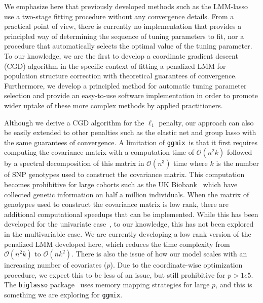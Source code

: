 \documentclass[12pt,letter]{article}\usepackage[]{graphicx}\usepackage[]{color}
\newcommand{\ggmix}{\texttt{ggmix}}
\begin{document}

We emphasize here that previously developed methods such as the LMM-lasso~\citep{rakitsch2013lasso} use a two-stage fitting procedure without any convergence details.
From a practical point of view, there is currently no implementation that provides a principled way of determining the sequence of tuning parameters to fit, nor a procedure that automatically selects the optimal value of the tuning parameter.
To our knowledge, we are the first to develop a coordinate gradient descent (CGD) algorithm in the specific context of fitting a penalized LMM for population structure correction with theoretical guarantees of convergence. Furthermore, we develop a principled method for automatic tuning parameter selection and provide an easy-to-use software implementation in order to promote wider uptake of these more complex methods by applied practitioners. 




Although we derive a CGD algorithm for the $\ell_1$ penalty, our approach can also be easily extended to other penalties such as the elastic net and group lasso with the same guarantees of convergence.
A limitation of \ggmix ~is that it first requires computing the covariance matrix with a computation time of $\mathcal{O}(n^2k)$ followed by a spectral decomposition of this matrix in $\mathcal{O}(n^3)$ time where $k$ is the number of SNP genotypes used to construct the covariance matrix. This computation becomes prohibitive for large cohorts such as the UK Biobank~\citep{allen2012uk} which have collected genetic information on half a million individuals. When the matrix of genotypes used to construct the covariance matrix is low rank, there are additional computational speedups that can be implemented. While this has been developed for the univariate case~\citep{lippert2011fast}, to our knowledge, this has not been explored in the multivariable case. We are currently developing a low rank version of the penalized LMM developed here, which reduces the time complexity from $\mathcal{O}(n^2k)$ to $\mathcal{O}(nk^2)$. There is also the issue of how our model scales with an increasing number of covariates ($p$). Due to the coordinate-wise optimization procedure, we expect this to be less of an issue, but still prohibitive for $p>1e5$. The \texttt{biglasso} package~\citep{zeng2017biglasso} uses memory mapping strategies for large $p$, and this is something we are exploring for \texttt{ggmix}.
\end{document}
